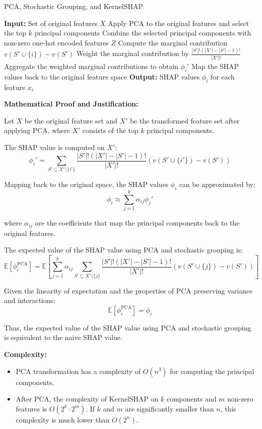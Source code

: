 \begin{algorithm}[H]
\label{algo:pca}
\caption{PCA, Stochastic Grouping, and KernelSHAP}
\begin{algorithmic}[1]
\State \textbf{Input:} Set of original features $X$
\State Apply PCA to the original features and select the top $k$ principal components
\State Combine the selected principal components with non-zero one-hot encoded features $Z$
        \State Compute the marginal contribution $v(S' \cup \{i\}) - v(S')$
        \State Weight the marginal contribution by $\frac{|S'|!(|X'| - |S'| - 1)!}{|X'|!}$
    \EndFor
    \State Aggregate the weighted marginal contributions to obtain $\phi_i'$
\EndFor
\State Map the SHAP values back to the original feature space
\State \textbf{Output:} SHAP values $\phi_i$ for each feature $x_i$
\end{algorithmic}
\end{algorithm}

\textbf{Mathematical Proof and Justification:}

Let $X$ be the original feature set and $X'$ be the transformed feature set after applying PCA, where $X'$ consists of the top $k$ principal components.

The SHAP value is computed on $X'$:
\[ \phi_i' = \sum_{S' \subseteq X' \setminus \{i'\}} \frac{|S'|!(|X'| - |S'| - 1)!}{|X'|!} (v(S' \cup \{i'\}) - v(S')) \]

Mapping back to the original space, the SHAP values $\phi_i$ can be approximated by:
\[ \phi_i \approx \sum_{j=1}^k \alpha_{ij} \phi_j' \]

where $\alpha_{ij}$ are the coefficients that map the principal components back to the original features.

The expected value of the SHAP value using PCA and stochastic grouping is:
\[ \mathbb{E}[\phi_i^{\text{PCA}}] = \mathbb{E} \left[ \sum_{j=1}^k \alpha_{ij} \sum_{S' \subseteq X' \setminus \{j\}} \frac{|S'|!(|X'| - |S'| - 1)!}{|X'|!} (v(S' \cup \{j\}) - v(S')) \right] \]

Given the linearity of expectation and the properties of PCA preserving variance and interactions:
\[ \mathbb{E}[\phi_i^{\text{PCA}}] = \phi_i \]

Thus, the expected value of the SHAP value using PCA and stochastic grouping is equivalent to the naive SHAP value.

\textbf{Complexity:}
\begin{itemize}
  \item PCA transformation has a complexity of $O(n^3)$ for computing the principal components.
  \item After PCA, the complexity of KernelSHAP on $k$ components and $m$ non-zero features is $O(2^k \cdot 2^m)$. If $k$ and $m$ are significantly smaller than $n$, this complexity is much lower than $O(2^n)$.
\end{itemize}

